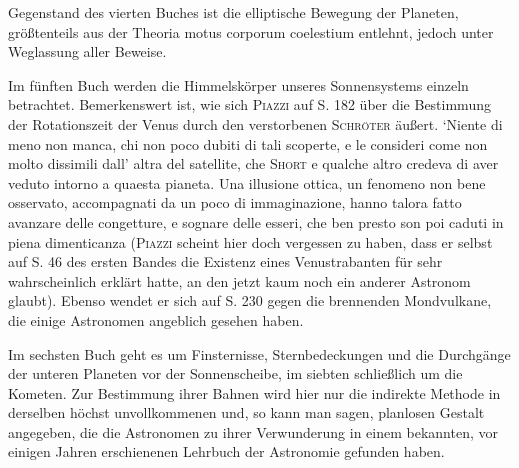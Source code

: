 Gegenstand des vierten Buches ist die elliptische Bewegung der Planeten, größtenteils aus der Theoria motus corporum coelestium entlehnt, jedoch unter Weglassung aller Beweise.

Im fünften Buch werden die Himmelskörper unseres Sonnensystems einzeln betrachtet. Bemerkenswert ist, wie sich \textsc{Piazzi} auf S. 182 über die Bestimmung der Rotationszeit der Venus durch den verstorbenen \textsc{Schröter} äußert. `Niente di meno non manca, chi non poco dubiti di tali scoperte, e le consideri come non molto dissimili dall' altra del satellite, che \textsc{Short} e qualche altro credeva di aver veduto intorno a quaesta pianeta. Una illusione ottica, un fenomeno non bene osservato, accompagnati da un poco di immaginazione, hanno talora fatto avanzare delle congetture, e sognare delle esseri, che ben presto son poi caduti in piena dimenticanza (\textsc{Piazzi} scheint hier doch vergessen zu haben, dass er selbst auf S. 46 des ersten Bandes die Existenz eines Venustrabanten für sehr wahrscheinlich erklärt hatte, an den jetzt kaum noch ein anderer Astronom glaubt). Ebenso wendet er sich auf S. 230 gegen die brennenden Mondvulkane, die einige Astronomen angeblich gesehen haben.

Im sechsten Buch geht es um Finsternisse, Sternbedeckungen und die Durchgänge der unteren Planeten vor der Sonnenscheibe, im siebten schließlich um die Kometen. Zur Bestimmung ihrer Bahnen wird hier nur die indirekte Methode in derselben höchst unvollkommenen und, so kann man sagen, planlosen Gestalt angegeben, die die Astronomen zu ihrer Verwunderung in einem bekannten, vor einigen Jahren erschienenen Lehrbuch der Astronomie gefunden haben.
\par\clearpage\endgroup
